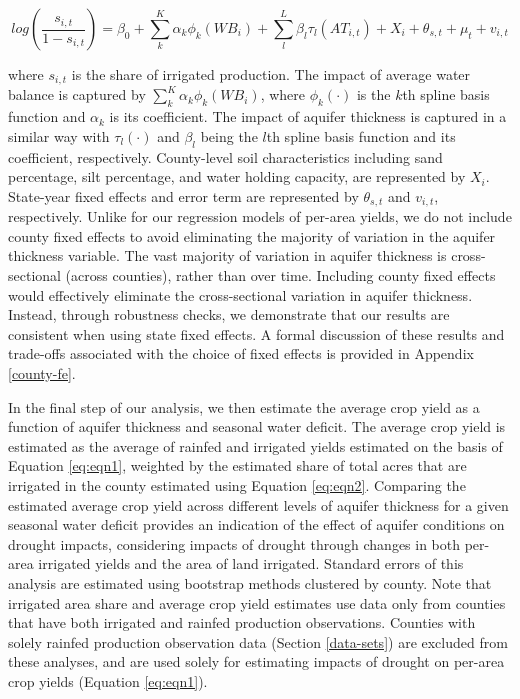 \documentclass[
]{article}
\begin{document}
\begin{equation}
    log(\frac{s_{i,t}}{1-s_{i,t}}) = \beta_0 + \sum_{k}^K \alpha_{k}\phi_{k}(WB_{i}) + \sum_{l}^L \beta_{l}\tau_{l}(AT_{i,t}) + X_i + \theta_{s,t} + \mu_t + v_{i,t} \label{eq:eqn2}
\end{equation}

where \(s_{i,t}\) is the share of irrigated production. The impact of average water balance is captured by \(\sum_{k}^K \alpha_{k}\phi_{k}(WB_{i})\), where \(\phi_{k}(\cdot)\) is the \(k\)th spline basis function and \(\alpha_{k}\) is its coefficient. The impact of aquifer thickness is captured in a similar way with \(\tau_{l}(\cdot)\) and \(\beta_{l}\) being the \(l\)th spline basis function and its coefficient, respectively. County-level soil characteristics including sand percentage, silt percentage, and water holding capacity, are represented by \(X_i\). State-year fixed effects and error term are represented by \(\theta_{s,t}\) and \(v_{i,t}\), respectively. Unlike for our regression models of per-area yields, we do not include county fixed effects to avoid eliminating the majority of variation in the aquifer thickness variable. The vast majority of variation in aquifer thickness is cross-sectional (across counties), rather than over time. Including county fixed effects would effectively eliminate the cross-sectional variation in aquifer thickness. Instead, through robustness checks, we demonstrate that our results are consistent when using state fixed effects. A formal discussion of these results and trade-offs associated with the choice of fixed effects is provided in Appendix \ref{county-fe}.

In the final step of our analysis, we then estimate the average crop yield as a function of aquifer thickness and seasonal water deficit. The average crop yield is estimated as the average of rainfed and irrigated yields estimated on the basis of Equation \eqref{eq:eqn1}, weighted by the estimated share of total acres that are irrigated in the county estimated using Equation \eqref{eq:eqn2}. Comparing the estimated average crop yield across different levels of aquifer thickness for a given seasonal water deficit provides an indication of the effect of aquifer conditions on drought impacts, considering impacts of drought through changes in both per-area irrigated yields and the area of land irrigated. Standard errors of this analysis are estimated using bootstrap methods clustered by county. Note that irrigated area share and average crop yield estimates use data only from counties that have both irrigated and rainfed production observations. Counties with solely rainfed production observation data (Section \ref{data-sets}) are excluded from these analyses, and are used solely for estimating impacts of drought on per-area crop yields (Equation \eqref{eq:eqn1}).
\end{document}
